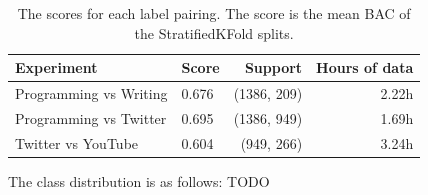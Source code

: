         \begin{table}[h]
            \centering
            \begin{tabular}{llrr}
                \toprule
                Experiment & Score & Support & Hours of data \\
                \midrule
                Programming vs Writing & 0.676 & (1386, 209) & 2.22h \\
                Programming vs Twitter & 0.695 &  (1386, 949) & 1.69h \\
                Twitter vs YouTube & 0.604 & (949, 266) & 3.24h \\
                \bottomrule
            \end{tabular}
            \caption{The scores for each label pairing. The score is the mean BAC of the StratifiedKFold splits.}\label{table:scores-natural}
        \end{table}

        The class distribution is as follows: TODO
